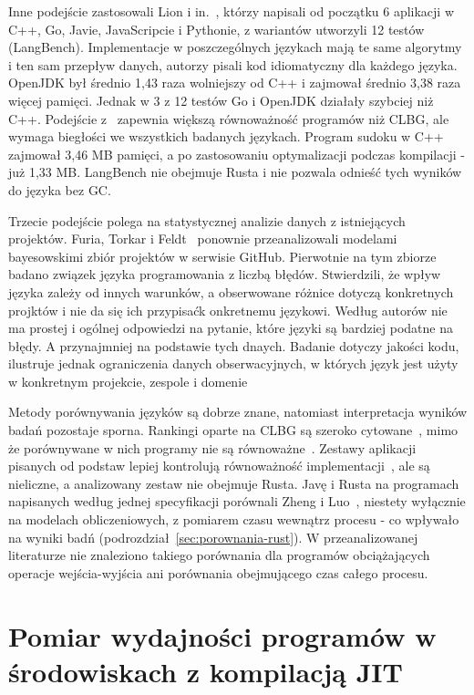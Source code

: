 Inne podejście zastosowali Lion i in.~\cite{lion2022}, którzy napisali od początku 6 aplikacji w C++, Go, Javie, JavaScripcie i Pythonie, z wariantów utworzyli 12 testów (LangBench).
Implementacje w poszczególnych językach mają te same algorytmy i ten sam przepływ danych, autorzy pisali kod idiomatyczny dla każdego języka.
OpenJDK był średnio 1,43 raza wolniejszy od C++ i zajmował średnio 3,38 raza więcej pamięci.
Jednak w 3 z 12 testów Go i OpenJDK działały szybciej niż C++.
Podejście z~\cite{lion2022} zapewnia większą równoważność programów niż CLBG, ale wymaga biegłości we wszystkich badanych językach.
Program sudoku w C++ zajmował 3,46 MB pamięci, a po zastosowaniu optymalizacji podczas kompilacji - już 1,33 MB. LangBench nie obejmuje Rusta i nie pozwala odnieść tych wyników do języka bez GC.

Trzecie podejście polega na statystycznej analizie danych z istniejących projektów.
Furia, Torkar i Feldt~\cite{furia2022} ponownie przeanalizowali modelami bayesowskimi zbiór projektów w serwisie GitHub.
Pierwotnie na tym zbiorze badano związek języka programowania z liczbą błędów.
Stwierdzili, że wpływ języka zależy od innych warunków, a obserwowane różnice dotyczą konkretnych projktów i nie da się ich przypisaćk onkretnemu językowi.
Według autorów nie ma prostej i ogólnej odpowiedzi na pytanie, które języki są bardziej podatne na błędy.
A przynajmniej na podstawie tych dnaych.
Badanie dotyczy jakości kodu, ilustruje jednak ograniczenia danych obserwacyjnych, w których język jest użyty w konkretnym projekcie, zespole i domenie

Metody porównywania języków są dobrze znane, natomiast interpretacja wyników badań pozostaje sporna.
Rankingi oparte na CLBG są szeroko cytowane~\cite{pereira2021}, mimo że porównywane w nich programy nie są równoważne~\cite{vankempen2025}.
Zestawy aplikacji pisanych od podstaw lepiej kontrolują równoważność implementacji~\cite{lion2022}, ale są nieliczne, a analizowany zestaw nie obejmuje Rusta.
Javę i Rusta na programach napisanych według jednej specyfikacji porównali Zheng i Luo~\cite{zheng2026}, niestety wyłącznie na modelach obliczeniowych, z pomiarem czasu wewnątrz procesu - co wpływało na wyniki badń (podrozdział~\ref{sec:porownania-rust}).
W przeanalizowanej literaturze nie znaleziono takiego porównania dla programów obciążających operacje wejścia-wyjścia ani porównania obejmującego czas całego procesu.

\section{Pomiar wydajności programów w środowiskach z kompilacją JIT}
\label{sec:pomiar-jit}

